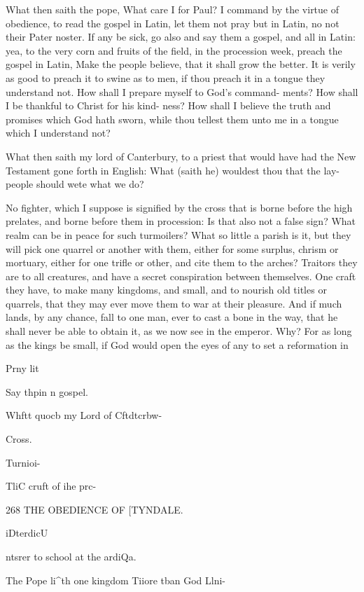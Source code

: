 \documentclass{custom}
\begin{document}
{What then saith the pope, What care I for Paul? I 
command by the virtue of obedience, to read the gospel 
in Latin, let them not pray but in Latin, no not their 
Pater noster. If any be sick, go also and say them 
a gospel, and all in Latin: yea, to the very corn and 
fruits of the field, in the procession week, preach the 
gospel in Latin, Make the people believe, that it shall 
grow the better. It is verily as good to preach it to swine 
as to men, if thou preach it in a tongue they understand 
not. How shall I prepare myself to God's command- 
ments? How shall I be thankful to Christ for his kind- 
ness? How shall I believe the truth and promises which 
God hath sworn, while thou tellest them unto me in a 
tongue which I understand not? 

What then saith my lord of Canterbury, to a priest 
that would have had the New Testament gone forth in 
English: What (saith he) wouldest thou that the lay- 
people should wete what we do? 

No fighter, which I suppose is signified by the cross 
that is borne before the high prelates, and borne before 
them in procession: Is that also not a false sign? What 
realm can be in peace for such turmoilers? What so 
little a parish is it, but they will pick one quarrel or 
another with them, either for some surplus, chrism or 
mortuary, either for one trifle or other, and cite them to 
the arches? Traitors they are to all creatures, and have 
a secret conspiration between themselves. One craft they 
have, to make many kingdoms, and small, and to nourish 
old titles or quarrels, that they may ever move them to 
war at their pleasure. And if much lands, by any chance, 
fall to one man, ever to cast a bone in the way, that he 
shall never be able to obtain it, as we now see in the 
emperor. Why? For as long as the kings be small, if 
God would open the eyes of any to set a reformation in 

Prny lit 

Say thpin n 
gospel. 

Whftt 
quocb my 
Lord of 
Cftdtcrbw- 

Cross. 

Turnioi- 

TliC cruft 
of ihe prc- 


268
THE OBEDIENCE OF
[TYNDALE.

iDterdicU 

ntsrer to 
school at 
the ardiQa. 

The Pope 
li^th one 
kingdom 
Tiiore tban 
God Llni- 

}
\end{document}

